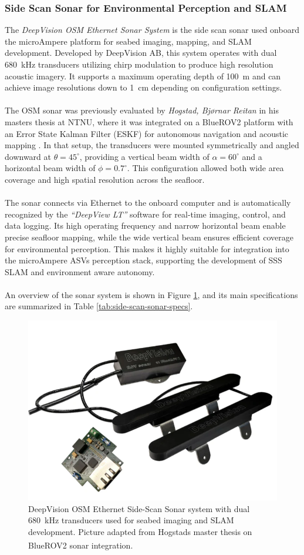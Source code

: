 \subsubsection{Side Scan Sonar for Environmental Perception and SLAM}
The \textit{DeepVision OSM Ethernet Sonar System} is the side scan sonar used onboard the microAmpere platform for seabed imaging, mapping, and SLAM development. Developed by DeepVision AB, this system operates with dual 680~kHz transducers utilizing chirp modulation to produce high resolution acoustic imagery. It supports a maximum operating depth of 100~m and can achieve image resolutions down to 1~cm depending on configuration settings.
\\ \\
The OSM sonar was previously evaluated by \textit{Hogstad, Bjørnar Reitan} in his masters thesis at NTNU, where it was integrated on a BlueROV2 platform with an Error State Kalman Filter (ESKF) for autonomous navigation and acoustic mapping \cite{side_scan_sonar_master_thesis_data_sheet}. In that setup, the transducers were mounted symmetrically and angled downward at $\theta = 45^{\circ}$, providing a vertical beam width of $\alpha = 60^{\circ}$ and a horizontal beam width of $\phi = 0.7^{\circ}$. This configuration allowed both wide area coverage and high spatial resolution across the seafloor.
\\ \\
The sonar connects via Ethernet to the onboard computer and is automatically recognized by the \textit{``DeepView LT''} software for real-time imaging, control, and data logging. Its high operating frequency and narrow horizontal beam enable precise seafloor mapping, while the wide vertical beam ensures efficient coverage for environmental perception. This makes it highly suitable for integration into the microAmpere ASVs perception stack, supporting the development of SSS SLAM and environment aware autonomy.
\\ \\
An overview of the sonar system is shown in Figure \ref{fig:microAmpere-side-scan-sonar}, and its main specifications are summarized in Table \ref{tab:side-scan-sonar-specs}.
\begin{figure}[H]
    \centering
    \includegraphics[width=0.5\linewidth]{Pictures/Hardware/Sensors/Side_Scan_Sonar.png}
    \caption{DeepVision OSM Ethernet Side-Scan Sonar system with dual 680~kHz transducers used for seabed imaging and SLAM development. Picture adapted from Hogstads master thesis on BlueROV2 sonar integration.\textsuperscript{\cite{side_scan_sonar_master_thesis_data_sheet}}}
    \label{fig:microAmpere-side-scan-sonar}
\end{figure}

